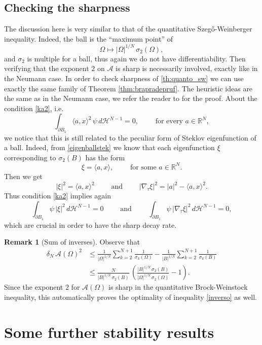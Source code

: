\documentclass{amsart}
\theoremstyle{definition}
\newtheorem{remark}[lemma]{Remark}
\numberwithin{equation}{section}
\begin{document}
\subsection{Checking the sharpness}
The discussion here is very similar to that of the quantitative Szeg\H{o}-Weinberger inequality. Indeed, the ball is the ``maximum point'' of
\[
\Omega\mapsto |\Omega|^{1/N}\,\sigma_2(\Omega),
\]
and $\sigma_2$ is multiple for a ball, thus again we do not have differentiability. Then verifying that the exponent $2$ on $\mathcal{A}$ is sharp is necessarily involved, exactly like in the Neumann case.
In order to check sharpness of \eqref{th:quanto_sw} we can use exactly the same family of Theorem \ref{thm:brapradepruf}. The heuristic ideas are the same as in the Neumann case, we refer the reader to \cite[Section 6]{MR2913683} for the proof. About the condition \eqref{ka2}, i.e.
\[
\int_{\partial B_1} \langle a,x\rangle^2\,\psi\,d\mathcal{H}^{N-1}=0,\qquad \mbox{ for every }a\in\mathbb{R}^N,
\]
we notice that this is still related to the peculiar form of Steklov eigenfunction of a ball. Indeed, from \eqref{eigenballstek} we know that each eigenfunction $\xi$ corresponding to $\sigma_2(B)$ has the form
\[
\xi=\langle a,x\rangle,\qquad \mbox{ for some } a\in\mathbb{R}^N.
\]
Then we get
\[
|\xi|^2=\langle a,x\rangle^2\qquad \mbox{ and }\qquad |\nabla_\tau\xi|^2=|a|^2-\langle a,x\rangle^2.
\]
Thus condition \eqref{ka2} implies again
\[
\int_{\partial B_1} \psi\,|\xi|^2\,d\mathcal{H}^{N-1}=0\qquad \mbox{ and }\qquad \int_{\partial B_1} \psi\,|\nabla_\tau\xi|^2\,d\mathcal{H}^{N-1}=0,
\]
which are crucial in order to have the sharp decay rate.
\begin{remark}[Sum of inverses]
Observe that 
\[
\begin{split}
\delta_N\,\mathcal{A}(\Omega)^2&\le \frac{1}{|\Omega|^{1/N}}\sum\limits_{k=2}^{N+1} \frac{1}{\sigma_k(\Omega)}-\frac{1}{|B|^{1/N}}\sum\limits_{k=2}^{N+1} \frac{1}{\sigma_k(B)}\\
&\le \frac{N}{|B|^{1/N}\,\sigma_2(B)}\,\left(\frac{|B|^{1/N}\,\sigma_2(B)}{|\Omega|^{1/N}\,\sigma_2(\Omega)}-1\right).
\end{split}
\]
Since the exponent $2$ for $\mathcal{A}(\Omega)$ is sharp in the quantitative Brock-Weinstock inequality, this automatically proves the optimality of inequality \eqref{inverso} as well.
\end{remark}

\section{Some further stability results}
\label{sec:6}
\end{document}
